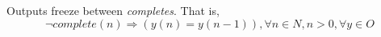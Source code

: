 Outputs freeze between \emph{completes}. That is,
\begin{equation} 
\label{eqn:outputfreeze}
\lnot complete(n) \Rightarrow (y(n) = y(n-1)), \forall n \in N, n>0, \forall y \in O
\end{equation}





